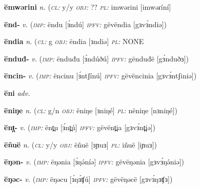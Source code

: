 \newentry
\headword\textbf{ëmwərini}  
\ipa{[ɜmwəɾíní]}
\synpos\textit{n.} 
\class(\textit{\textsc{cl:}} {y/y}
\object\textit{\textsc{obj:}} ??
\plural\textit{\textsc{pl:}} imwərini [imwəɾíní]

\newentry
\headword\textbf{ënd-}  
\ipa{[ɜ́nd-]}
\synpos\textit{v.} 
\imperative(\textit {\textsc{imp:}} ëndu [ɜ́ndú] 
\imperfective\textit{\textsc{ipfv:}} gëvëndia [gɜvɜ́ndiə])


\newentry
\headword\textbf{ëndia}  
\ipa{[ɜndiə]}
\synpos\textit{n.} 
\class(\textit{\textsc{cl:}} {g}
\object\textit{\textsc{obj:}} ëndia [ɜndiə]
\plural\textit{\textsc{pl:}} NONE

\newentry
\headword\textbf{ënduđ-}  
\ipa{[ɜ́nduð-]}
\synpos\textit{v.} 
\imperative(\textit {\textsc{imp:}} ënduđu [ɜ́ndúðú] 
\imperfective\textit{\textsc{ipfv:}} gënduđë [gɜ́nduðɜ])

\newentry
\headword\textbf{ëncin-}  
\ipa{[ɜ́ntʃin-]}
\synpos\textit{v.} 
\imperative(\textit {\textsc{imp:}} ëncinu [ɜ́ntʃínú] 
\imperfective\textit{\textsc{ipfv:}} gëvëncinia [gɜvɜ́ntʃiniə])

\newentry
\headword\textbf{ëni}  
\ipa{[ɜni]}
\synpos\textit{adv.} 


\newentry
\headword\textbf{ëniŋe}  
\ipa{[ɜniŋé]}
\synpos\textit{n.} 
\class(\textit{\textsc{cl:}} {g/n}
\object\textit{\textsc{obj:}} ëniŋe [ɜniŋé]
\plural\textit{\textsc{pl:}} nëniŋe [nɜniŋé])

\newentry
\headword\textbf{ënt̪-}  
\ipa{[ɜ́nt̪-]}
\synpos\textit{v.} 
\imperative(\textit {\textsc{imp:}} ënt̪u [ɜ́nt̪ú] 
\imperfective\textit{\textsc{ipfv:}} gëvënt̪ia [gɜvɜ́nt̪iə])


\newentry
\headword\textbf{ëñuë}  
\ipa{[ɜɲuɜ]}
\synpos\textit{n.} 
\class(\textit{\textsc{cl:}} {y/y}
\object\textit{\textsc{obj:}} ëñuë [ɜɲuɜ]
\plural\textit{\textsc{pl:}} iñuë [iɲuɜ])

\newentry
\headword\textbf{ëŋən-}  
\ipa{[ɜ́ŋə́n-]}
\synpos\textit{v.} 
\imperative(\textit {\textsc{imp:}} ëŋənia [ɜ́ŋə́níə] 
\imperfective\textit{\textsc{ipfv:}} gëvëŋənia [gɜvɜ́ŋə́niə])

\newentry
\headword\textbf{ëŋəc-}  
\ipa{[ɜ́ŋɜʧ-]}
\synpos\textit{v.} 
\imperative(\textit {\textsc{imp:}} ëŋəcu [ɜ́ŋɜ́ʧú] 
\imperfective\textit{\textsc{ipfv:}} gëvëŋəcë [gɜvɜ́ŋɜʧɜ])

